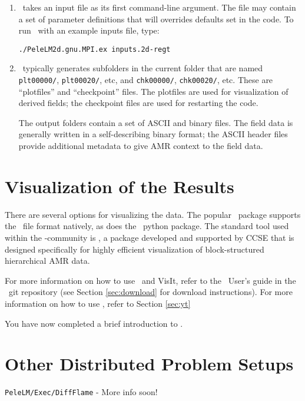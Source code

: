 \begin{enumerate}

\item \pelelm\ takes an input file as its first command-line argument.  The file may
contain a set of parameter definitions that will overrides defaults set in the code.
  To run \pelelm\ with an example inputs file, type:
\begin{verbatim}
./PeleLM2d.gnu.MPI.ex inputs.2d-regt
\end{verbatim}

\item \pelelm\ typically generates subfolders in the current folder that
  are named {\tt plt00000/}, {\tt plt00020/}, etc, and {\tt chk00000/},
  {\tt chk00020/}, etc. These are ``plotfiles'' and ``checkpoint''
  files. The plotfiles are used for visualization of derived fields; the checkpoint
  files are used for restarting the code.

  The output folders contain a set of ASCII and binary files.  The field
  data is generally written in a self-describing binary format; the 
  ASCII header files provide additional metadata to give AMR context to the field data.

\end{enumerate}

\section{Visualization of the Results}

There are several options for visualizing the data.  The popular
\visit\ package supports the \amrex\ file format natively, as does
the \yt\ python package.  The standard tool used within the
\amrex-community is \amrvis, a package developed and supported 
by CCSE that is designed specifically for highly efficient visualization
of block-structured hierarchical AMR data.

For more information on how to use \amrvis\ and VisIt, refer to the \amrex\
User's guide in the \amrex\ git repository (see Section \ref{sec:download}
for download instructions).
For more information on how to use \yt, refer to Section \ref{sec:yt}

You have now completed a brief introduction to \pelelm. 

\section{Other Distributed Problem Setups}
{\tt PeleLM/Exec/DiffFlame} - More info soon!
